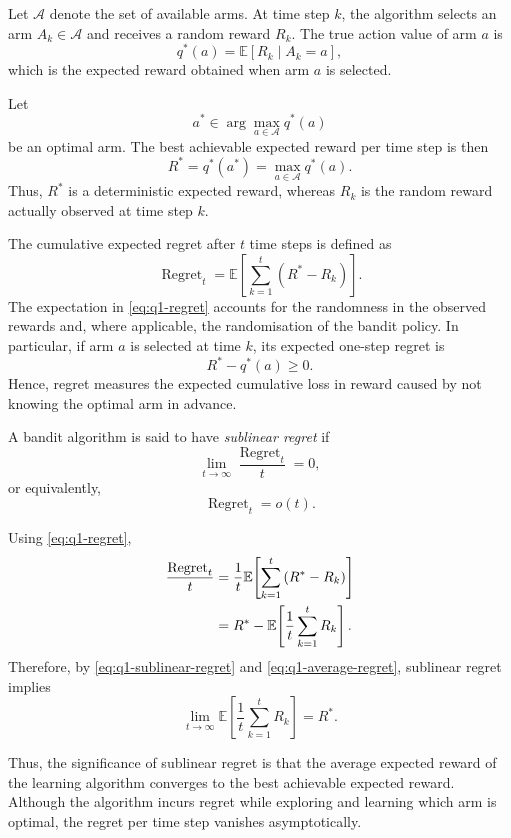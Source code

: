 Let $\mathcal{A}$ denote the set of available arms. At time step $k$, the
algorithm selects an arm $A_k\in\mathcal{A}$ and receives a random reward
$R_k$. The true action value of arm $a$ is
\[
    q^\ast(a)
    =
    \mathbb{E}\!\left[R_k \mid A_k=a\right],
\]
which is the expected reward obtained when arm $a$ is selected.

Let
\[
    a^\ast \in \arg\max_{a\in\mathcal{A}} q^\ast(a)
\]
be an optimal arm. The best achievable expected reward per time step is then
\[
    R^\ast
    =
    q^\ast(a^\ast)
    =
    \max_{a\in\mathcal{A}} q^\ast(a).
\]
Thus, $R^\ast$ is a deterministic expected reward, whereas $R_k$ is the
random reward actually observed at time step $k$.

The cumulative expected regret after $t$ time steps is defined as
\begin{equation}
    \operatorname{Regret}_t
    =
    \mathbb{E}\!\left[
        \sum_{k=1}^{t}
        \left(R^\ast-R_k\right)
    \right].
    \label{eq:q1-regret}
\end{equation}
The expectation in \eqref{eq:q1-regret} accounts for the randomness in the
observed rewards and, where applicable, the randomisation of the bandit
policy. In particular, if arm $a$ is selected at time $k$, its expected
one-step regret is
\[
    R^\ast-q^\ast(a)\geq 0.
\]
Hence, regret measures the expected cumulative loss in reward caused by not
knowing the optimal arm in advance.

A bandit algorithm is said to have \emph{sublinear regret} if
\begin{equation}
    \lim_{t\to\infty}
    \frac{\operatorname{Regret}_t}{t}
    =
    0,
    \label{eq:q1-sublinear-regret}
\end{equation}
or equivalently,
\[
    \operatorname{Regret}_t=o(t).
\]

Using \eqref{eq:q1-regret},
\begin{align}
    \frac{\operatorname{Regret}_t}{t}
    &=
    \frac{1}{t}
    \mathbb{E}\!\left[
        \sum_{k=1}^{t}
        \left(R^\ast-R_k\right)
    \right]
    \notag\\
    &=
    R^\ast
    -
    \mathbb{E}\!\left[
        \frac{1}{t}\sum_{k=1}^{t}R_k
    \right].
    \label{eq:q1-average-regret}
\end{align}
Therefore, by \eqref{eq:q1-sublinear-regret} and
\eqref{eq:q1-average-regret}, sublinear regret implies
\[
    \lim_{t\to\infty}
    \mathbb{E}\!\left[
        \frac{1}{t}\sum_{k=1}^{t}R_k
    \right]
    =
    R^\ast.
\]

Thus, the significance of sublinear regret is that the average expected
reward of the learning algorithm converges to the best achievable expected
reward. Although the algorithm incurs regret while exploring and learning
which arm is optimal, the regret per time step vanishes asymptotically.